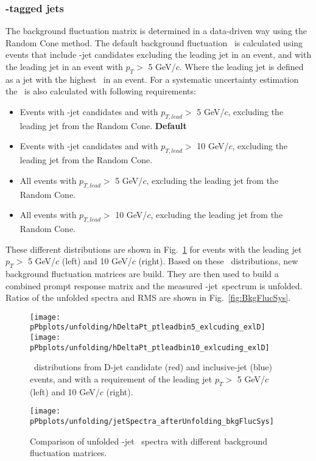 \subsubsection{\Dstar-tagged jets}
The background fluctuation matrix is determined in a data-driven way using the Random Cone method.
The default background fluctuation \deltapt\ is calculated using events that include \Dstar-jet candidates excluding the leading jet in an event, and with the leading jet in an event with $p_{T}>$ 5 GeV/$c$. Where the leading jet is defined as a jet with the highest \pt\ in an event.
For a systematic uncertainty estimation the \deltapt\ is also calculated with following requirements:
\begin{itemize}
\item Events with \Dstar-jet candidates and with $p_{T, lead}>$ 5 GeV/$c$, excluding the leading jet from the Random Cone. \textbf{Default}
\item Events with \Dstar-jet candidates and with $p_{T, lead}>$ 10 GeV/$c$, excluding the leading jet from the Random Cone.
\item All events with $p_{T, lead}>$ 5 GeV/$c$, excluding the leading jet from the Random Cone.
\item All events with $p_{T, lead}>$ 10 GeV/$c$, excluding the leading jet from the Random Cone.
\end{itemize}

These different distributions are shown in Fig.~\ref{fig:DeltaPtSys} for events with the leading jet $p_{T}>$ 5 GeV/$c$ (left) and 10 GeV/$c$ (right). Based on these \deltapt\ distributions, new background fluctuation matrices are build. They are then used to build a combined prompt response matrix and the measured \Dstar-jet\ \pt spectrum is unfolded. Ratios of the unfolded spectra and RMS are shown in Fig.~\ref{fig:BkgFlucSys}.
 
\begin{figure}[bth]
\centering
\texttt{[image: pPbplots/unfolding/hDeltaPt\_ptleadbin5\_exlcuding\_exlD]}
\texttt{[image: pPbplots/unfolding/hDeltaPt\_ptleadbin10\_exlcuding\_exlD]}
\caption{ \deltapt\ distributions from D-jet candidate (red) and inclusive-jet (blue) events, and with a requirement of the leading jet $p_{T}>$ 5 GeV/$c$ (left) and 10 GeV/$c$ (right).}
\label{fig:DeltaPtSys}
\end{figure}

\begin{figure}[bth]
\centering
\texttt{[image: pPbplots/unfolding/jetSpectra\_afterUnfolding\_bkgFlucSys]}
\caption{ Comparison of unfolded \Dstar-jet \pt\ spectra with different background fluctuation matrices.}
\label{fig:BkgFlucSpec}
\end{figure}

